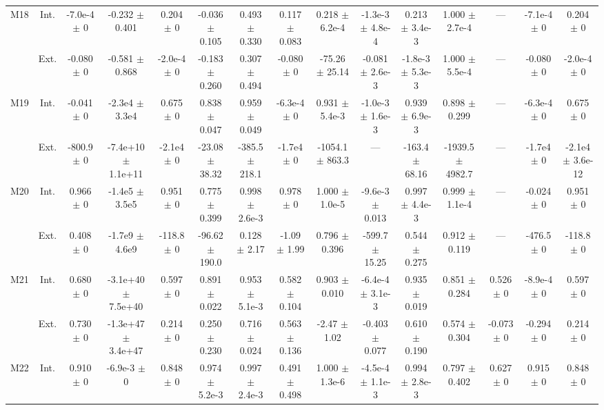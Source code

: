 \begin{table}[htbp]
{\begin{tabular}{@{}ccccccccccccccc@{}}
\cline{2-15}
\multirow{2}{*}{M18} & Int. & -7.0e-4 $\pm$ 0 & -0.232 $\pm$ 0.401 & 0.204 $\pm$ 0 & -0.036 $\pm$ 0.105 & 0.493 $\pm$ 0.330 & 0.117 $\pm$ 0.083 & 0.218 $\pm$ 6.2e-4 & -1.3e-3 $\pm$ 4.8e-4 & 0.213 $\pm$ 3.4e-3 & 1.000 $\pm$ 2.7e-4 & --- & -7.1e-4 $\pm$ 0 & 0.204 $\pm$ 0 \\
 & Ext. & -0.080 $\pm$ 0 & -0.581 $\pm$ 0.868 & -2.0e-4 $\pm$ 0 & -0.183 $\pm$ 0.260 & 0.307 $\pm$ 0.494 & -0.080 $\pm$ 0 & -75.26 $\pm$ 25.14 & -0.081 $\pm$ 2.6e-3 & -1.8e-3 $\pm$ 5.3e-3 & 1.000 $\pm$ 5.5e-4 & --- & -0.080 $\pm$ 0 & -2.0e-4 $\pm$ 0 \\
\cline{2-15}
\multirow{2}{*}{M19} & Int. & -0.041 $\pm$ 0 & -2.3e4 $\pm$ 3.3e4 & 0.675 $\pm$ 0 & 0.838 $\pm$ 0.047 & 0.959 $\pm$ 0.049 & -6.3e-4 $\pm$ 0 & 0.931 $\pm$ 5.4e-3 & -1.0e-3 $\pm$ 1.6e-3 & 0.939 $\pm$ 6.9e-3 & 0.898 $\pm$ 0.299 & --- & -6.3e-4 $\pm$ 0 & 0.675 $\pm$ 0 \\
 & Ext. & -800.9 $\pm$ 0 & -7.4e+10 $\pm$ 1.1e+11 & -2.1e4 $\pm$ 0 & -23.08 $\pm$ 38.32 & -385.5 $\pm$ 218.1 & -1.7e4 $\pm$ 0 & -1054.1 $\pm$ 863.3 & --- & -163.4 $\pm$ 68.16 & -1939.5 $\pm$ 4982.7 & --- & -1.7e4 $\pm$ 0 & -2.1e4 $\pm$ 3.6e-12 \\
\cline{2-15}
\multirow{2}{*}{M20} & Int. & 0.966 $\pm$ 0 & -1.4e5 $\pm$ 3.5e5 & 0.951 $\pm$ 0 & 0.775 $\pm$ 0.399 & 0.998 $\pm$ 2.6e-3 & 0.978 $\pm$ 0 & 1.000 $\pm$ 1.0e-5 & -9.6e-3 $\pm$ 0.013 & 0.997 $\pm$ 4.4e-3 & 0.999 $\pm$ 1.1e-4 & --- & -0.024 $\pm$ 0 & 0.951 $\pm$ 0 \\
 & Ext. & 0.408 $\pm$ 0 & -1.7e9 $\pm$ 4.6e9 & -118.8 $\pm$ 0 & -96.62 $\pm$ 190.0 & 0.128 $\pm$ 2.17 & -1.09 $\pm$ 1.99 & 0.796 $\pm$ 0.396 & -599.7 $\pm$ 15.25 & 0.544 $\pm$ 0.275 & 0.912 $\pm$ 0.119 & --- & -476.5 $\pm$ 0 & -118.8 $\pm$ 0 \\
\cline{2-15}
\multirow{2}{*}{M21} & Int. & 0.680 $\pm$ 0 & -3.1e+40 $\pm$ 7.5e+40 & 0.597 $\pm$ 0 & 0.891 $\pm$ 0.022 & 0.953 $\pm$ 5.1e-3 & 0.582 $\pm$ 0.104 & 0.903 $\pm$ 0.010 & -6.4e-4 $\pm$ 3.1e-3 & 0.935 $\pm$ 0.019 & 0.851 $\pm$ 0.284 & 0.526 $\pm$ 0 & -8.9e-4 $\pm$ 0 & 0.597 $\pm$ 0 \\
 & Ext. & 0.730 $\pm$ 0 & -1.3e+47 $\pm$ 3.4e+47 & 0.214 $\pm$ 0 & 0.250 $\pm$ 0.230 & 0.716 $\pm$ 0.024 & 0.563 $\pm$ 0.136 & -2.47 $\pm$ 1.02 & -0.403 $\pm$ 0.077 & 0.610 $\pm$ 0.190 & 0.574 $\pm$ 0.304 & -0.073 $\pm$ 0 & -0.294 $\pm$ 0 & 0.214 $\pm$ 0 \\
\cline{2-15}
\multirow{2}{*}{M22} & Int. & 0.910 $\pm$ 0 & -6.9e-3 $\pm$ 0 & 0.848 $\pm$ 0 & 0.974 $\pm$ 5.2e-3 & 0.997 $\pm$ 2.4e-3 & 0.491 $\pm$ 0.498 & 1.000 $\pm$ 1.3e-6 & -4.5e-4 $\pm$ 1.1e-3 & 0.994 $\pm$ 2.8e-3 & 0.797 $\pm$ 0.402 & 0.627 $\pm$ 0 & 0.915 $\pm$ 0 & 0.848 $\pm$ 0 \\

\end{tabular}}
\end{table}
